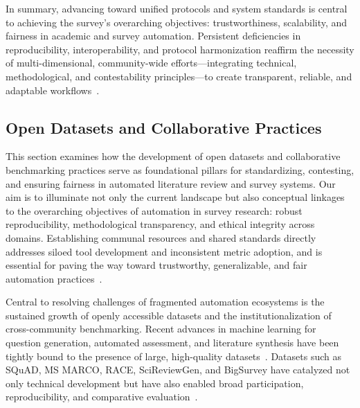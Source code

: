 \documentclass[sigconf]{acmart}
\begin{document}
In summary, advancing toward unified protocols and system standards is central to achieving the survey’s overarching objectives: trustworthiness, scalability, and fairness in academic and survey automation. Persistent deficiencies in reproducibility, interoperability, and protocol harmonization reaffirm the necessity of multi-dimensional, community-wide efforts—integrating technical, methodological, and contestability principles—to create transparent, reliable, and adaptable workflows~\cite{ref1,ref2,ref9,ref10,ref29,ref37,ref43,ref61,ref62,ref63,ref68,ref78,ref80,ref86,ref87,ref88,ref89,ref90,ref96,ref98,ref106}.

\subsection{Open Datasets and Collaborative Practices}

This section examines how the development of open datasets and collaborative benchmarking practices serve as foundational pillars for standardizing, contesting, and ensuring fairness in automated literature review and survey systems. Our aim is to illuminate not only the current landscape but also conceptual linkages to the overarching objectives of automation in survey research: robust reproducibility, methodological transparency, and ethical integrity across domains. Establishing communal resources and shared standards directly addresses siloed tool development and inconsistent metric adoption, and is essential for paving the way toward trustworthy, generalizable, and fair automation practices~\cite{ref34,ref80,ref104,ref106}.

Central to resolving challenges of fragmented automation ecosystems is the sustained growth of openly accessible datasets and the institutionalization of cross-community benchmarking. Recent advances in machine learning for question generation, automated assessment, and literature synthesis have been tightly bound to the presence of large, high-quality datasets~\cite{ref26,ref27,ref31,ref32,ref33,ref34,ref35,ref68,ref78,ref80,ref84,ref98,ref100,ref102,ref104,ref106}. Datasets such as SQuAD, MS MARCO, RACE, SciReviewGen, and BigSurvey have catalyzed not only technical development but have also enabled broad participation, reproducibility, and comparative evaluation~\cite{ref1,ref31,ref32,ref84,ref98}.
\end{document}
